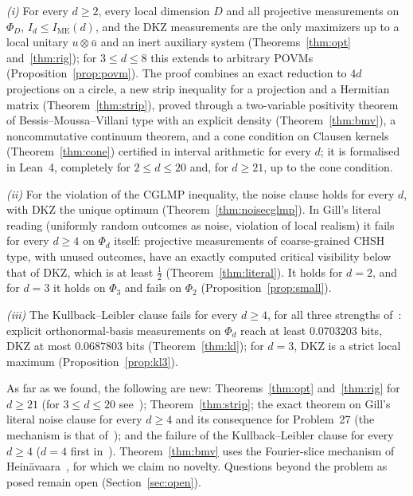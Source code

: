 \documentclass[11pt]{article}
\theoremstyle{remark}
\numberwithin{equation}{section}
\newcommand{\IME}{I_{\mathrm{ME}}}
\begin{document}
\emph{(i)} For every $d\ge2$, every local dimension $D$ and all projective measurements on $\Phi_D$, $I_d\le\IME(d)$,
and the DKZ measurements are the only maximizers up to a local unitary $u\otimes\bar u$ and an inert auxiliary system
(Theorems~\ref{thm:opt} and~\ref{thm:rig}); for $3\le d\le8$ this extends to arbitrary POVMs
(Proposition~\ref{prop:povm}). The proof combines an exact reduction to $4d$ projections on a circle, a new strip
inequality for a projection and a Hermitian matrix (Theorem~\ref{thm:strip}), proved through a two-variable positivity
theorem of Bessis--Moussa--Villani type with an explicit density (Theorem~\ref{thm:bmv}), a noncommutative continuum
theorem, and a cone condition on Clausen kernels (Theorem~\ref{thm:cone}) certified in interval arithmetic for every $d$;
it is formalised in Lean~4, completely for $2\le d\le20$ and, for $d\ge21$, up to the cone condition.

\emph{(ii)} For the violation of the CGLMP inequality, the noise clause holds for every $d$, with DKZ the unique optimum
(Theorem~\ref{thm:noisecglmp}). In Gill's literal reading (uniformly random outcomes as noise, violation of local
realism) it fails for every $d\ge4$ on $\Phi_d$ itself: projective measurements of coarse-grained CHSH type, with unused
outcomes, have an exactly computed critical visibility below that of DKZ, which is at least $\frac12$
(Theorem~\ref{thm:literal}). It holds for $d=2$, and for $d=3$ it holds on $\Phi_3$ and fails on $\Phi_2$
(Proposition~\ref{prop:small}).

\emph{(iii)} The Kullback--Leibler clause fails for every $d\ge4$, for all three strengths of~\cite{vDGG}: explicit
orthonormal-basis measurements on $\Phi_d$ reach at least $0.0703203$ bits, DKZ at most $0.0687803$ bits
(Theorem~\ref{thm:kl}); for $d=3$, DKZ is a strict local maximum (Proposition~\ref{prop:kl3}).

As far as we found, the following are new: Theorems~\ref{thm:opt} and~\ref{thm:rig} for $d\ge21$ (for $3\le d\le20$
see~\cite{repoCGLMP}); Theorem~\ref{thm:strip}; the exact theorem on Gill's literal noise clause for every $d\ge4$ and
its consequence for Problem~27 (the mechanism is that of~\cite{ADGL}); and the failure of the Kullback--Leibler clause
for every $d\ge4$ ($d=4$ first in~\cite{Zhang}). Theorem~\ref{thm:bmv} uses the Fourier-slice mechanism of
Hein\"avaara~\cite{He}, for which we claim no novelty. Questions beyond the problem as posed remain open
(Section~\ref{sec:open}).
\end{document}
